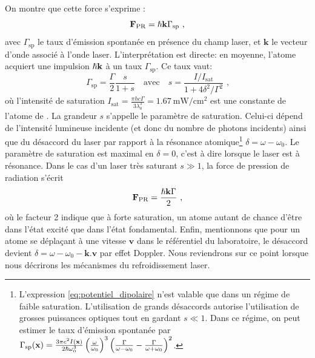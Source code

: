 On montre que cette force s'exprime \citep{cohen2012processus}:
\begin{equation}
\mathbf{F}_{\mathrm{PR}}=\hslash \mathbf{k} \Gamma_{\mathrm{sp}} \text{ ,}
\end{equation}
avec $\Gamma_{\mathrm{sp}}$ le taux d'émission spontanée en présence du champ laser, et $\mathbf{k}$ le vecteur d'onde associé à l'onde laser. L'interprétation est directe: en moyenne, l'atome acquiert une impulsion $\hslash \mathbf{k}$ à un taux $\Gamma_{\mathrm{sp}}$. Ce taux vaut:
\begin{equation}
\Gamma_{\mathrm{sp}}=\frac{\Gamma}{2} \frac{s}{1+s} \quad \text{avec} \quad s=\frac{I/I_{\mathrm{sat}}}{1+4\delta^2/\Gamma^2} \text{ ,}
\end{equation}
où l'intensité de saturation $I_{\mathrm{sat}}=\frac{\pi h c \Gamma}{3\lambda_0^3}=\SI{1.67}{\milli\watt\per\centi\metre^2}$ est une constante de l'atome de . La grandeur $s$ s'appelle le paramètre de saturation. Celui-ci dépend de l'intensité lumineuse incidente (et donc du nombre de photons incidents) ainsi que du désaccord du laser par rapport à la résonance atomique\footnote{L'expression \ref{eq:potentiel_dipolaire} n'est valable que dans un régime de faible saturation. L'utilisation de grands désaccords autorise l'utilisation de grosses puissances optiques tout en gardant $s\ll 1$. Dans ce régime, on peut estimer le taux d'émission spontanée par $\Gamma_{\mathrm{sp}}(\mathbf{x})=\frac{3 \pi c^2 I(\mathbf{x})}{2\hslash \omega_0^3} \left( \frac{\omega}{\omega_0}\right)^3 \left( \frac{\Gamma}{\omega-\omega_0}-\frac{\Gamma}{\omega+\omega_0} \right)^2$.} $\delta = \omega-\omega_0$.  Le paramètre de saturation est maximal en $\delta=0$, c'est à dire lorsque le laser est à résonance. Dans le cas d'un laser très saturant $s \gg 1$, la force de pression de radiation s'écrit
\begin{equation}
\mathbf{F}_{\mathrm{PR}}=\frac{\hslash \mathbf{k} \Gamma}{2} \text{ ,}
\end{equation}
où le facteur 2 indique que à forte saturation, un atome autant de chance d'être dans l'état excité que dans l'état fondamental. Enfin, mentionnons que pour un atome se déplaçant à une vitesse $\mathbf{v}$ dans le référentiel du laboratoire, le désaccord devient $\delta=\omega-\omega_0-\mathbf{k}.\mathbf{v}$ par effet Doppler. Nous reviendrons sur ce point lorsque nous décrirons les mécanismes du refroidissement laser.





